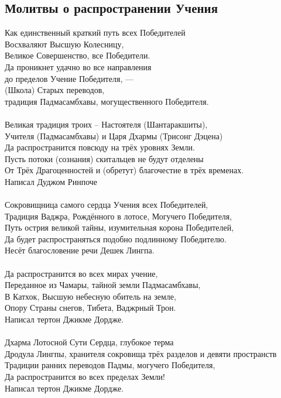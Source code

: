 \subsection{Молитвы о распространении Учения}

Как единственный краткий путь всех Победителей\\
Восхваляют Высшую Колесницу, \\ \indent Великое Совершенство, все Победители.\\
Да проникнет удачно во все направления \\ \indent до пределов Учение Победителя, —\\
(Школа) Старых переводов, \\ \indent традиция Падмасамбхавы, могущественного Победителя.\\
\\
Великая традиция троих – Настоятеля (Шантаракшиты),\\
Учителя (Падмасамбхавы) и Царя Дхармы (Трисонг Дэцена)\\
Да распространится повсюду на трёх уровнях Земли.\\
Пусть потоки (сознания) скитальцев не будут отделены\\
От Трёх Драгоценностей и (обретут) благочестие в трёх временах.\\
\scriptsize
Написал Дуджом Ринпоче\\
\normalsize
\\
Сокровищница самого сердца Учения всех Победителей,\\
Традиция Ваджра, Рождённого в лотосе, Могучего Победителя,\\
Путь острия великой тайны, изумительная корона Победителей,\\
Да будет распространяться подобно подлинному Победителю.\\
\scriptsize
Несёт благословение речи Дешек Лингпа.\\
\normalsize
\\
Да распространится во всех мирах учение,\\
Переданное из Чамары, тайной земли Падмасамбхавы,\\
В Катхок, Высшую небесную обитель на земле,\\
Опору Страны снегов, Тибета, Ваджрный Трон.\\
\scriptsize
Написал тертон Джикме Дордже.\\
\normalsize
\\
Дхарма Лотосной Сути Сердца, глубокое терма\\
Дродула Лингпы, хранителя сокровища трёх разделов и девяти пространств\\
Традиции ранних переводов Падмы, могучего Победителя,\\
Да распространится во всех пределах Земли!\\
\scriptsize
Написал тертон Джикме Дордже.\\
\normalsize
\\

